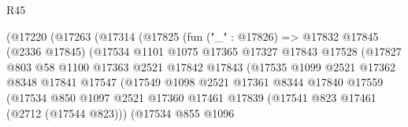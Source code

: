 \begin{lexlean}{R45}
\begin{coremodule}
                                (@17220
                                  (@17263
                                    (@17314
                                      (@17825
                                        (fun ("_" : @17826) =>
                                        @17832
                                          @17845
                                          (@2336 @17845)
                                          (@17534
                                            @1101
                                            @1075
                                            @17365
                                            @17327
                                            @17843
                                            @17528
                                            (@17827
                                              @803
                                              @58
                                              @1100
                                              @17363
                                              @2521
                                              @17842
                                              @17843
                                              (@17535
                                                @1099
                                                @2521
                                                @17362
                                                @8348
                                                @17841
                                                @17547
                                                (@17549
                                                  @1098
                                                  @2521
                                                  @17361
                                                  @8344
                                                  @17840
                                                  @17559
                                                  (@17534
                                                    @850
                                                    @1097
                                                    @2521
                                                    @17360
                                                    @17461
                                                    @17839
                                                    (@17541 @823 @17461 (@2712 (@17544 @823)))
                                                    (@17534
                                                      @855
                                                      @1096

\end{coremodule}
\end{lexlean}
